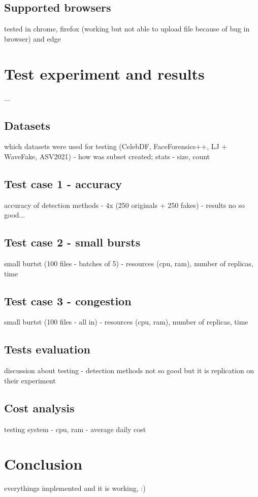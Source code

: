 \section{Supported browsers}
tested in chrome, firefox (working but not able to upload file because of bug in browser) and edge

\chapter{Test experiment and results}
...
\section{Datasets}
which datasets were used for testing (CelebDF, FaceForensics++, LJ + WaveFake, ASV2021) - how was subset created; stats - size, count
\section{Test case 1 - accuracy}
accuracy of detection methods - 4x (250 originals + 250 fakes) - results no so good...
\section{Test case 2 - small bursts}
small burtst (100 files - batches of 5) - resources (cpu, ram), number of replicas, time
\section{Test case 3 - congestion}
small burtst (100 files - all in) - resources (cpu, ram), number of replicas, time
\section{Tests evaluation}
discussion about testing - detection methods not so good but it is replication on their experiment
\section{Cost analysis}
testing system - cpu, ram - average daily cost 

\chapter{Conclusion}
everythings implemented and it is working, :)